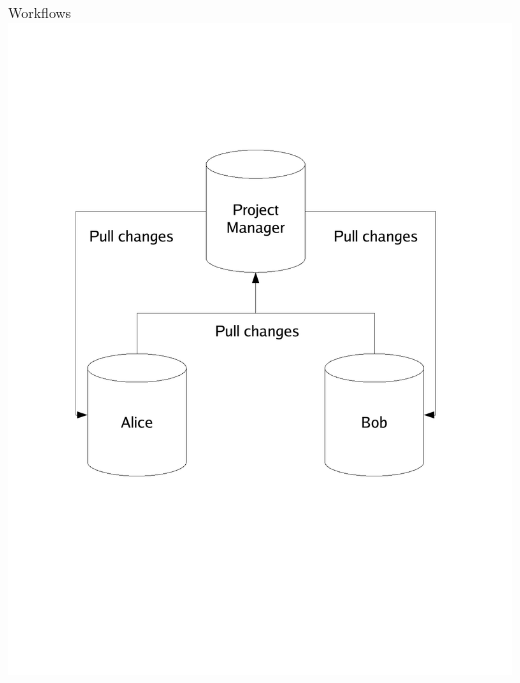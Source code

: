 \documentclass[final,hyperref={pdfpagelabels=false},notitlepage=true]{beamer}
\begin{document}
\begin{frame}{}
\begin{columns}[t]
\begin{column}{0.45\linewidth}
\begin{block}{\large Workflows}
          \includegraphics[scale=1.00]{images/collaborativeDevelopmentWithMaintainer.pdf}
        \end{block}


\end{column}
\end{columns}
\end{frame}
\end{document}
